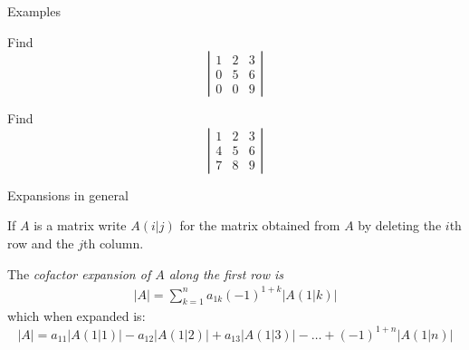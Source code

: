 \documentclass{beamer}
\begin{document}
\begin{frame}{Examples}
  \begin{example}
    Find
    \begin{equation*}
      \left|
	\begin{array}{ccc}
          1&2&3\\
          0&5&6\\
          0&0&9
	\end{array}
      \right|
    \end{equation*}
  \end{example}\vfill
  \begin{example}
    Find
    \begin{equation*}
      \left|
	\begin{array}{ccc}
          1&2&3\\
          4&5&6\\
          7&8&9
	\end{array}
      \right|
    \end{equation*}
  \end{example}
\end{frame}

\begin{frame}{Expansions in general}
  \begin{definition}
    If $A$ is a matrix write $A(i|j)$ for the matrix obtained from $A$ by deleting the $i$th row and the $j$th column.
  \end{definition}
  \begin{definition}
    The \emph{cofactor expansion of $A$ along the first row is}
    \begin{align*}
      \left|A\right| = \sum_{k=1}^na_{1k}(-1)^{1+k}\left| A(1| k) \right|
    \end{align*}
    which when expanded is:
    \begin{equation*}
      \left|A\right|= a_{11}\left| A(1| 1) \right|-a_{12}\left| A(1| 2) \right|+a_{13}\left| A(1| 3) \right|-\dots+(-1)^{1+n}\left| A(1| n) \right|
    \end{equation*}
  \end{definition}
\end{frame}
\end{document}
